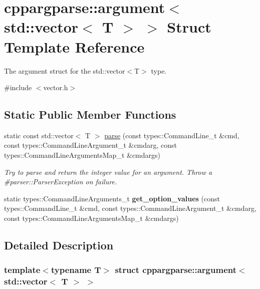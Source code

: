 \hypertarget{structcppargparse_1_1argument_3_01std_1_1vector_3_01T_01_4_01_4}{}\section{cppargparse\+:\+:argument$<$ std\+:\+:vector$<$ T $>$ $>$ Struct Template Reference}
\label{structcppargparse_1_1argument_3_01std_1_1vector_3_01T_01_4_01_4}


The argument struct for the std\+::vector$<$\+T$>$ type.  




{\ttfamily \#include $<$vector.\+h$>$}

\subsection*{Static Public Member Functions}
\begin{DoxyCompactItemize}
\item 
static const std\+::vector$<$ T $>$ \hyperlink{structcppargparse_1_1argument_3_01std_1_1vector_3_01T_01_4_01_4_a0e6251b0eaf62369653e4f5c1a40fffd}{parse} (const types\+::\+Command\+Line\+\_\+t \&cmd, const types\+::\+Command\+Line\+Argument\+\_\+t \&cmdarg, const types\+::\+Command\+Line\+Arguments\+Map\+\_\+t \&cmdargs)
\begin{DoxyCompactList}\small\item\em Try to parse and return the integer value for an argument. Throw a \#parser\+::\+Parser\+Exception on failure. \end{DoxyCompactList}\item 
\mbox{\label{structcppargparse_1_1argument_3_01std_1_1vector_3_01T_01_4_01_4_ae1b015416b1095055203b9ece6aa05f4}} 
static types\+::\+Command\+Line\+Arguments\+\_\+t {\bfseries get\+\_\+option\+\_\+values} (const types\+::\+Command\+Line\+\_\+t \&cmd, const types\+::\+Command\+Line\+Argument\+\_\+t \&cmdarg, const types\+::\+Command\+Line\+Arguments\+Map\+\_\+t \&cmdargs)
\end{DoxyCompactItemize}


\subsection{Detailed Description}
\subsubsection*{template$<$typename T$>$\newline
struct cppargparse\+::argument$<$ std\+::vector$<$ T $>$ $>$}

